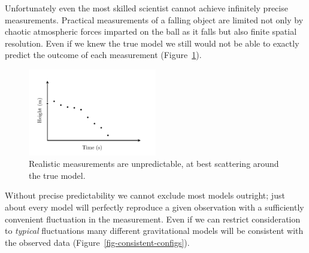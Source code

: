 \documentclass[
  letterpaper,
  DIV=11,
  numbers=noendperiod]{scrartcl}
\begin{document}
Unfortunately even the most skilled scientist cannot achieve infinitely
precise measurements. Practical measurements of a falling object are
limited not only by chaotic atmospheric forces imparted on the ball as
it falls but also finite spatial resolution. Even if we knew the true
model we still would not be able to exactly predict the outcome of each
measurement (Figure~\ref{fig-realistic-data}).

\begin{figure}

{\centering \includegraphics[width=0.5\textwidth,height=\textheight]{figures/gravity/data/data.pdf}

}

\caption{\label{fig-realistic-data}Realistic measurements are
unpredictable, at best scattering around the true model.}

\end{figure}

Without precise predictability we cannot exclude most models outright;
just about every model will perfectly reproduce a given observation with
a sufficiently convenient fluctuation in the measurement. Even if we can
restrict consideration to \emph{typical} fluctuations many different
gravitational models will be consistent with the observed data
(Figure~\ref{fig-consistent-configs}).
\end{document}
